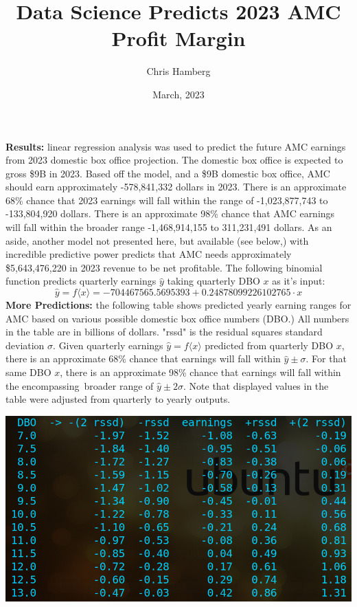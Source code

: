 \documentclass{article}
\title{Data Science Predicts 2023 AMC Profit Margin}
\author{Chris Hamberg}
\date{March, 2023}
\begin{document}
\maketitle{}
\textbf{Results:} 
linear regression analysis was used to predict the future AMC earnings from 
2023 domestic box office projection. The domestic box office is expected to gross
\$9B in 2023. Based off the model, and a \$9B domestic box office, AMC should 
earn approximately -578,841,332 dollars in 2023. There is an approximate 68\%
chance that 2023 earnings will fall within the range of -1,023,877,743 to 
-133,804,920 dollars. There is an approximate 98\% chance that AMC earnings will 
fall within the broader range -1,468,914,155 to 311,231,491 dollars. As an aside,
another model not presented here, but available (see below,) with incredible 
predictive power predicts that AMC needs approximately \$5,643,476,220 in 2023 
revenue to be net profitable. The following binomial function predicts quarterly 
earnings $\hat{y}$ taking quarterly DBO $x$ as it's input:
$$
\hat{y} = f \langle x \rangle 
= -704467565.5695393 + 0.24878099226102765 \cdot x
$$
\textbf{More Predictions:} the following table shows predicted yearly earning 
ranges for AMC based on various possible domestic box office numbers (DBO.) All 
numbers in the table are in billions of dollars. "rssd" is the residual squares 
standard deviation $\sigma$. Given quarterly earnings 
$\hat{y} = f \langle x \rangle$ predicted from quarterly DBO $x$, there is an 
approximate 68\% chance that earnings will fall within $\hat{y} \pm \sigma$. For 
that same DBO $x$, there is an approximate 98\% chance that earnings will fall 
within the \hbox{encompassing broader} range of $\hat{y} \pm 2\sigma$. Note that 
displayed values in the table were adjusted from quarterly to yearly outputs.
\newline
\begin{center}
    \includegraphics[scale=0.57]{prediction.png}
\end{center}
\end{document}
